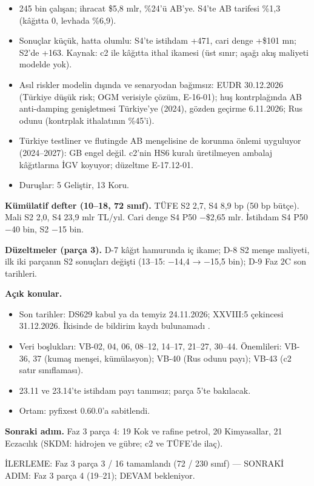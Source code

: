 \begin{itemize}
\tightlist
\item
  245 bin çalışan; ihracat \$5,8 mlr, \%24'ü AB'ye. S4'te AB tarifesi \%1,3 (kâğıtta 0, levhada \%6,9).
\item
  Sonuçlar küçük, hatta olumlu: S4'te istihdam +471, cari denge +\$101 mn; S2'de +163. Kaynak: c2 ile kâğıtta ithal ikamesi (üst sınır; aşağı akış maliyeti modelde yok).
\item
  Asıl riskler modelin dışında ve senaryodan bağımsız: EUDR 30.12.2026 (Türkiye düşük risk; OGM verisiyle çözüm, E-16-01); huş kontrplağında AB anti-damping genişletmesi Türkiye'ye (2024), gözden geçirme 6.11.2026; Rus odunu (kontrplak ithalatının \%45'i).
\item
  Türkiye testliner ve flutingde AB menşelisine de korunma önlemi uyguluyor (2024--2027): GB engel değil. c2'nin HS6 kuralı üretilmeyen ambalaj kâğıtlarına İGV koyuyor; düzeltme E-17.12-01.
\item
  Duruşlar: 5 Geliştir, 13 Koru.
\end{itemize}

\textbf{Kümülatif defter (10--18, 72 sınıf).} TÜFE S2 2,7, S4 8,9 bp (50 bp bütçe). Mali S2 2,0, S4 23,9 mlr TL/yıl. Cari denge S4 P50 −\$2,65 mlr. İstihdam S4 P50 −40 bin, S2 −15 bin.

\textbf{Düzeltmeler (parça 3).} D-7 kâğıt hamurunda iç ikame; D-8 S2 menşe maliyeti, ilk iki parçanın S2 sonuçları değişti (13--15: −14,4 → −15,5 bin); D-9 Faz 2C son tarihleri.

\textbf{Açık konular.}

\begin{itemize}
\tightlist
\item
  Son tarihler: DS629 kabul ya da temyiz 24.11.2026; XXVIII:5 çekincesi 31.12.2026. İkisinde de bildirim kaydı bulunamadı \etiketD{}.
\item
  Veri boşlukları: VB-02, 04, 06, 08--12, 14--17, 21--27, 30--44. Önemlileri: VB-36, 37 (kumaş menşei, kümülasyon); VB-40 (Rus odunu payı); VB-43 (c2 satır sınıflaması).
\item
  23.11 ve 23.14'te istihdam payı tanımsız; parça 5'te bakılacak.
\item
  Ortam: pyfixest 0.60.0'a sabitlendi.
\end{itemize}

\textbf{Sonraki adım.} Faz 3 parça 4: 19 Kok ve rafine petrol, 20 Kimyasallar, 21 Eczacılık (SKDM: hidrojen ve gübre; c2 ve TÜFE'de ilaç).

\begin{gbilerleme}

İLERLEME: Faz 3 parça 3 / 16 tamamlandı (72 / 230 sınıf) --- SONRAKİ ADIM: Faz 3 parça 4 (19--21); DEVAM bekleniyor.

\end{gbilerleme}
